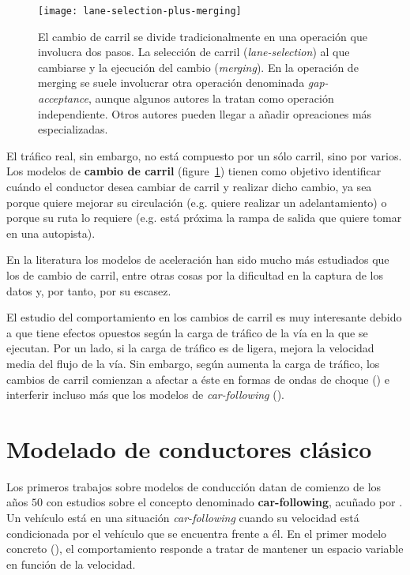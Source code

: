 \begin{figure}[b]
	\centering
	\texttt{[image: lane-selection-plus-merging]}
	\caption[Operaciones involucradas en el proceso de cambio de carril]{El cambio de carril se divide tradicionalmente en una operación que involucra dos pasos. La selección de carril (\textit{lane-selection}) al que cambiarse y la ejecución del cambio (\textit{merging}). En la operación de merging se suele involucrar otra operación denominada \textit{gap-acceptance}, aunque algunos autores la tratan como operación independiente. Otros autores pueden llegar a añadir opreaciones más especializadas.}
	\label{fig:lane-selection-plus-merging}
\end{figure}

El tráfico real, sin embargo, no está compuesto por un sólo carril, sino por varios. Los modelos de \textbf{cambio de carril} (figure~\ref{fig:lane-selection-plus-merging}) tienen como objetivo identificar cuándo el conductor desea cambiar de carril y realizar dicho cambio, ya sea porque quiere mejorar su circulación (e.g. quiere realizar un adelantamiento) o porque su ruta lo requiere (e.g. está próxima la rampa de salida que quiere tomar en una autopista).

En la literatura los modelos de aceleración han sido mucho más estudiados que los de cambio de carril, entre otras cosas por la dificultad en la captura de los datos y, por tanto, por su escasez.

El estudio del comportamiento en los cambios de carril es muy interesante debido a que tiene efectos opuestos según la carga de tráfico de la vía en la que se ejecutan. Por un lado, si la carga de tráfico es de ligera, mejora la velocidad media del flujo de la vía. Sin embargo, según aumenta la carga de tráfico, los cambios de carril comienzan a afectar a éste en formas de ondas de choque (\cite{Sasoh2002, Jin2006}) e interferir incluso más que los modelos de \textit{\gls{car-following}} (\cite{Laval2006}).

\section{Modelado de conductores clásico}

Los primeros trabajos sobre modelos de conducción datan de comienzo de los años $50$ con estudios sobre el concepto denominado \textbf{\gls{car-following}}, acuñado por \cite{reuschel1950fahrzeugbewegungen}. Un vehículo está en una situación \textit{\gls{car-following}} cuando su velocidad está condicionada por el vehículo que se encuentra frente a él. En el primer modelo concreto (\cite{Pipes1953}), el comportamiento responde a tratar de mantener un espacio variable en función de la velocidad.

